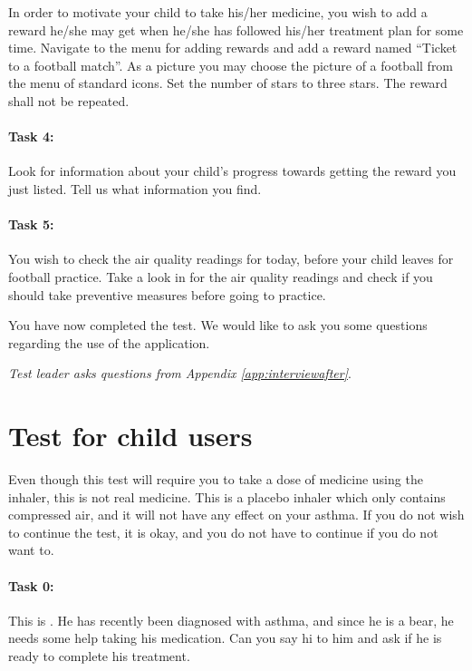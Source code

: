 In order to motivate your child to take his/her medicine, you wish to add a reward he/she may get when he/she has followed his/her treatment plan for some time. 
Navigate to the menu for adding rewards and add a reward named ``Ticket to a football match''. As a picture you may choose the picture of a football from the menu of standard icons. Set the number of stars to three stars. The reward shall not be repeated. 


\paragraph{Task 4:}

Look for information about your child's progress towards getting the reward you just listed. Tell us what information you find.

\paragraph{Task 5:}

You wish to check the air quality readings for today, before your child leaves for football practice. Take a look in for the air quality readings and check if you should take preventive measures before going to practice.  

You have now completed the test. We would like to ask you some questions regarding the use of the application. 

\emph{Test leader asks questions from Appendix \ref{app:interviewafter}}.

\section{Test for child users}
\label{sec:childtest}

Even though this test will require you to take a dose of medicine using the inhaler, this is not real medicine. This is a placebo inhaler which only contains compressed air, and it will not have any effect on your asthma. If you do not wish to continue the test, it is okay, and you do not have to continue if you do not want to. 
 
\paragraph{Task 0:}

This is \ab{}. He has recently been diagnosed with asthma, and since he is a bear, he needs some help taking his medication. Can you say hi to him and ask if he is ready to complete his treatment. 

